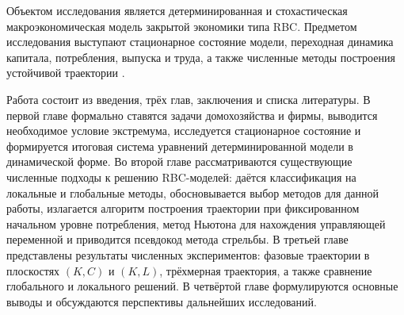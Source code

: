 Объектом исследования является детерминированная и стохастическая макроэкономическая модель закрытой экономики типа RBC. Предметом исследования выступают стационарное состояние модели, переходная динамика капитала, потребления, выпуска и труда, а также численные методы построения устойчивой траектории \cite{judd1998numerical, fernandez2015solution}.

Работа состоит из введения, трёх глав, заключения и списка литературы. В первой главе формально ставятся задачи домохозяйства и фирмы, выводится необходимое условие экстремума, исследуется стационарное состояние и формируется итоговая система уравнений детерминированной модели в динамической форме. Во второй главе рассматриваются существующие численные подходы к решению RBC-моделей: даётся классификация на локальные и глобальные методы, обосновывается выбор методов для данной работы, излагается алгоритм построения траектории при фиксированном начальном уровне потребления, метод Ньютона для нахождения управляющей переменной и приводится псевдокод метода стрельбы. В третьей главе представлены результаты численных экспериментов: фазовые траектории в плоскостях $(K, C)$ и $(K, L)$, трёхмерная траектория, а также сравнение глобального и локального решений. В четвёртой главе формулируются основные выводы и обсуждаются перспективы дальнейших исследований.